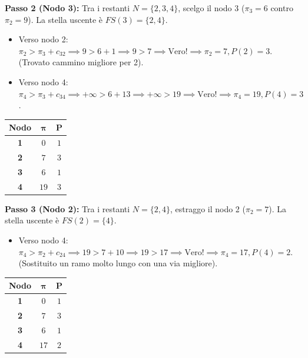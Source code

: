 \documentclass[12pt, a4paper]{article}
\begin{document}
	\textbf{Passo 2 (Nodo 3):}
	Tra i restanti $N=\{2, 3, 4\}$, scelgo il nodo 3 ($\pi_3 = 6$ contro $\pi_2=9$). 
	La stella uscente è $FS(3) = \{2, 4\}$.
	\begin{itemize}
		\item Verso nodo 2: $\pi_2 > \pi_3 + c_{32} \implies 9 > 6 + 1 \implies 9 > 7 \implies \text{Vero!} \implies \pi_2=7, P(2)=3$. (Trovato cammino migliore per 2).
		\item Verso nodo 4: $\pi_4 > \pi_3 + c_{34} \implies +\infty > 6 + 13 \implies +\infty > 19 \implies \text{Vero!} \implies \pi_4=19, P(4)=3$.
	\end{itemize}
	\begin{table}[H]
		\centering
		\begin{tabular}{|c|c|c|}
			\hline
			\textbf{Nodo} & $\boldsymbol{\pi}$ & $\mathbf{P}$ \\
			\hline
			\rowcolor{titlecolor!20} \textbf{1} & $0$ & $1$ \\
			\textbf{2} & $7$ & $3$ \\
			\rowcolor{titlecolor!20} \textbf{3} & $6$ & $1$ \\
			\textbf{4} & $19$ & $3$ \\
			\hline
		\end{tabular}
	\end{table}
	
	\textbf{Passo 3 (Nodo 2):}
	Tra i restanti $N=\{2, 4\}$, estraggo il nodo 2 ($\pi_2 = 7$). 
	La stella uscente è $FS(2) = \{4\}$.
	\begin{itemize}
		\item Verso nodo 4: $\pi_4 > \pi_2 + c_{24} \implies 19 > 7 + 10 \implies 19 > 17 \implies \text{Vero!} \implies \pi_4=17, P(4)=2$. (Sostituito un ramo molto lungo con una via migliore).
	\end{itemize}
	\begin{table}[H]
		\centering
		\begin{tabular}{|c|c|c|}
			\hline
			\textbf{Nodo} & $\boldsymbol{\pi}$ & $\mathbf{P}$ \\
			\hline
			\rowcolor{titlecolor!20} \textbf{1} & $0$ & $1$ \\
			\rowcolor{titlecolor!20} \textbf{2} & $7$ & $3$ \\
			\rowcolor{titlecolor!20} \textbf{3} & $6$ & $1$ \\
			\textbf{4} & $17$ & $2$ \\
			\hline
		\end{tabular}
	\end{table}
	
\end{document}

